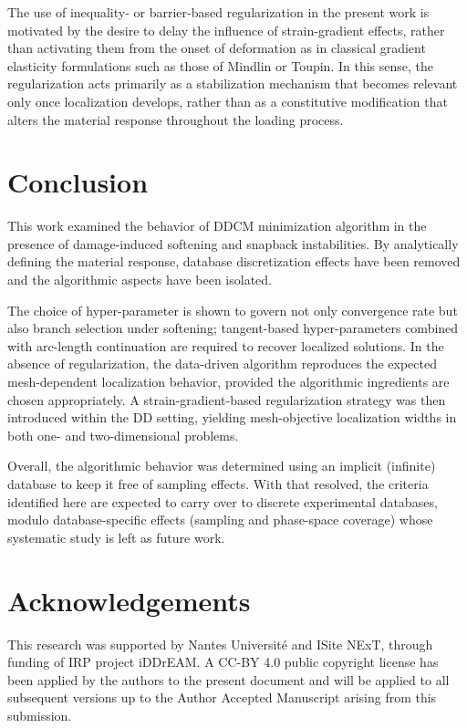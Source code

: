 \documentclass[10pt,review]{cas-sc}
\begin{document}
The use of inequality- or barrier-based regularization in the present work is motivated by the desire to delay the influence of strain-gradient effects, rather than activating them from the onset of deformation as in classical gradient elasticity formulations such as those of Mindlin or Toupin. In this sense, the regularization acts primarily as a stabilization mechanism that becomes relevant only once localization develops, rather than as a constitutive modification that alters the material response throughout the loading process.


\section{Conclusion}

This work examined the behavior of DDCM minimization algorithm in the presence of damage-induced softening and snapback instabilities. By analytically defining the material response, database discretization effects have been removed and the algorithmic aspects have been isolated.

The choice of hyper-parameter is shown to govern not only convergence rate but also branch selection under softening; tangent-based hyper-parameters combined with arc-length continuation are required to recover localized solutions. In the absence of regularization, the data-driven algorithm reproduces the expected mesh-dependent localization behavior, provided the algorithmic ingredients are chosen appropriately. A strain-gradient-based regularization strategy was then introduced within the DD setting, yielding mesh-objective localization widths in both one- and two-dimensional problems.

Overall, the algorithmic behavior was determined using an implicit (infinite) database to keep it free of sampling effects. With that resolved, the criteria identified here are expected to carry over to discrete experimental databases, modulo database-specific effects (sampling and phase-space coverage) whose systematic study is left as future work.

\section*{Acknowledgements} 
This research was supported by Nantes Université and ISite NExT, through funding of IRP project iDDrEAM. A CC-BY 4.0 public copyright license has been applied by the authors to the present document and will be applied to all subsequent versions up to the Author Accepted Manuscript arising from this submission.
\end{document}
